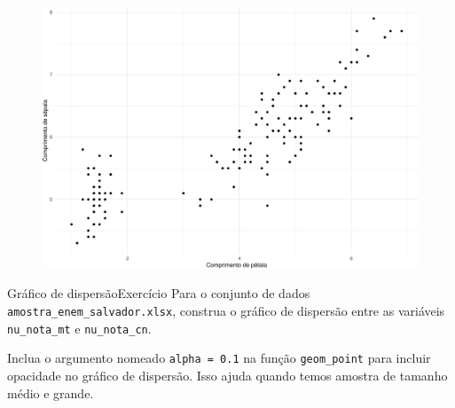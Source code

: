 \documentclass[
  10pt,
  ignorenonframetext,
]{beamer}
\begin{document}
\begin{frame}
\begin{figure}

{\centering \includegraphics[width=1\textwidth,height=\textheight]{exploracao-visualizacao_files/figure-beamer/unnamed-chunk-128-1.pdf}

}

\end{figure}
\end{frame}

\begin{frame}[fragile]{Gráfico de dispersão\newline Exercício}
\protect\hypertarget{gruxe1fico-de-dispersuxe3oexercuxedcio}{}
Para o conjunto de dados \texttt{amostra\_enem\_salvador.xlsx}, construa
o gráfico de dispersão entre as variáveis \texttt{nu\_nota\_mt} e
\texttt{nu\_nota\_cn}.

Inclua o argumento nomeado \texttt{alpha\ =\ 0.1} na função
\texttt{geom\_point} para incluir opacidade no gráfico de dispersão.
Isso ajuda quando temos amostra de tamanho médio e grande.
\end{frame}
\end{document}
